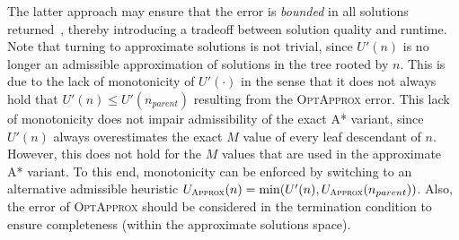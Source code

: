 \documentclass[letterpaper]{article} %
\newcommand{\samd}{\ac{SAMD}\xspace}
\newcommand{\astar}{\textsc{A*}\xspace}
\newcommand{\optapprox}{\textsc{OptApprox}\xspace}
\newcommand{\appr}{\textsc{Approx}\xspace}
\newcommand\Roni[1]{\nb{\textbf{Roni:}}{blue}{#1}}
\begin{document}
The latter approach may ensure that the error is \emph{bounded} in all solutions returned~\cite{cohen2018optimal}, thereby introducing a tradeoff between solution quality and runtime. Note that turning to approximate solutions is not trivial, since $U'(n)$ is no longer an admissible approximation of solutions in the tree rooted by $n$.  This is due to the lack of monotonicity of $U'(\cdot)$ in the sense that it does not always hold that $U'(n) \leq U'(n_{parent})$ resulting from the \optapprox error. This lack of monotonicity does not impair admissibility of the exact \astar variant, since $U'(n)$ always overestimates the exact $M$ value of every leaf descendant of $n$. However, this does not hold for the $M$ values that are used in the approximate \astar variant. To this end, monotonicity can be enforced by switching to an alternative admissible heuristic $U_\appr(n) = \min (U'(n),U_\appr(n_{parent}))$. Also, the error of \optapprox should be considered in the termination condition to ensure completeness (within the approximate solutions space).



\end{document}
